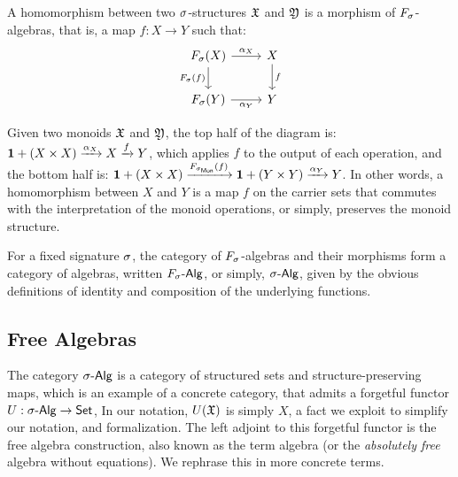 \begin{definition}[Homomorphism]
    A homomorphism between two $\sigma$-structures $\mathfrak{X}$ and $\mathfrak{Y}$ is a morphism of $\Sig$-algebras,
    that is, a map $f : X \to Y$ such that:
    \[
        \begin{tikzcd}
            \Sig(X) \arrow[r, "\alpha_{X}"] \arrow[d, "\Sig(f)"']
            & X \arrow[d, "f"] \\
            \Sig(Y) \arrow[r, "\alpha_{Y}"']
            & Y
        \end{tikzcd}
    \]
\end{definition}

\begin{example}
    Given two monoids \(\mathfrak{X}\) and \(\mathfrak{Y}\), the top half of the diagram is:
    \({{\mathbf{1}} + (X \times X) \xrightarrow{\alpha_{X}} X \xrightarrow{f} Y}\), which applies \(f\) to the output of each operation,
    and the bottom half is:
    \({\unitt + (X \times X) \xto{\SigMon(f)} \unitt + (Y \times Y) \xto{\alpha_{Y}} Y}\).
    In other words, a homomorphism between $X$ and $Y$ is a map $f$ on the carrier sets that commutes with the
    interpretation of the monoid operations, or simply, preserves the monoid structure.
\end{example}

For a fixed signature $\sigma$,
the category of $\Sig$-algebras and their morphisms form a category of algebras,
written $\SigAlg$, or simply, $\sigAlg$,
given by the obvious definitions of identity and composition of the underlying functions.

\subsection{Free Algebras}
\label{sec:universal-algebra:free-algebras}

The category $\sigAlg$ is a category of structured sets and structure-preserving maps,
which is an example of a concrete category, that admits a forgetful functor $U : \sigAlg \to \Set$,
%
In our notation, $U(\mathfrak{X})$ is simply $X$, a fact we exploit to simplify our notation, and formalization.
%
The left adjoint to this forgetful functor is the free algebra construction,
also known as the term algebra (or the \emph{absolutely free} algebra without equations).
%
We rephrase this in more concrete terms.

